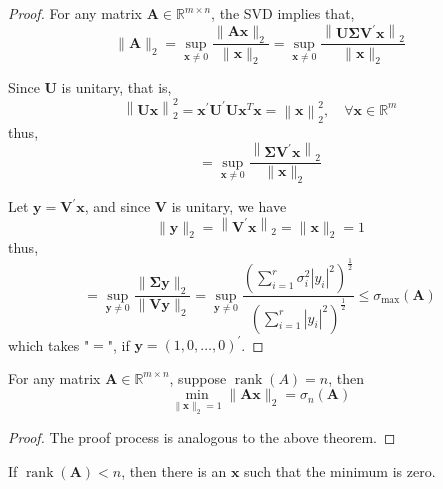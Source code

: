 \begin{proof}
    For any matrix $\mathbf{A}\in\mathbb{R}^{m\times n}$, the SVD implies that,
    \begin{equation*}
        \|\mathbf{A}\|_{2}=\sup_{\mathbf{x}\neq 0}\frac{\|\mathbf{A}\mathbf{x}\|_{2}}{\|\mathbf{x}\|_{2}}=\sup_{\mathbf{x}\neq 0}\frac{\left\|\mathbf{U}\boldsymbol{\Sigma}\mathbf{V}^{\prime}\mathbf{x}\right\|_{2}}{\|\mathbf{x}\|_{2}}
    \end{equation*}

    Since $\mathbf{U}$ is unitary, that is,
    \begin{equation*}
        \left\|\mathbf{U}\mathbf{x}\right\|_{2}^{2}=\mathbf{x}^{\prime}\mathbf{U}^{\prime}\mathbf{U}\mathbf{x}^{T}\mathbf{x}=\left\|\mathbf{x}\right\|_{2}^{2},\quad\forall\mathbf{x}\in\mathbb{R}^{m}
    \end{equation*}
    thus,
    \begin{equation*}
        =\sup_{\mathbf{x}\neq 0}\frac{\left\|\boldsymbol{\Sigma}\mathbf{V}^{\prime}\mathbf{x}\right\|_{2}}{\|\mathbf{x}\|_{2}}
    \end{equation*}

    Let $\mathbf{y}=\mathbf{V}^{\prime}\mathbf{x}$, and since $\mathbf{V}$ is unitary, we have
    \begin{equation*}
        \|\mathbf{y}\|_{2}=\left\|\mathbf{V}^{\prime}\mathbf{x}\right\|_{2}=\|\mathbf{x}\|_{2}=1
    \end{equation*}
    thus,
    \begin{equation*}
        =\sup_{\mathbf{y}\neq 0}\frac{\|\boldsymbol{\Sigma}\mathbf{y}\|_{2}}{\|\mathbf{V}\mathbf{y}\|_{2}}=\sup_{\mathbf{y}\neq 0}\frac{\left(\sum_{i=1}^{r}\sigma_{i}^{2}\left|y_{i}\right|^{2}\right)^{\frac{1}{2}}}{\left(\sum_{i=1}^{r}\left|y_{i}\right|^{2}\right)^{\frac{1}{2}}}\leq\sigma_{\max}(\mathbf{A})
    \end{equation*}
    which takes "$=$", if $\boldsymbol{y}=\left(1,0,\ldots,0\right)^{\prime}$.
\end{proof}

\begin{theorem}
    For any matrix $\mathbf{A}\in\mathbb{R}^{m\times n}$, suppose $\operatorname{rank}(A)=n$, then
    \begin{equation}
        \min_{\|\mathbf{x}\|_{2}=1}\|\mathbf{A}\mathbf{x}\|_{2}=\sigma_{n}(\mathbf{A})
    \end{equation}
\end{theorem}

\begin{proof}
    The proof process is analogous to the above theorem.
\end{proof}

\begin{remark}
    If $\operatorname{rank}(\mathbf{A})<n$, then there is an $\mathbf{x}$ such that the minimum is zero.
\end{remark}
